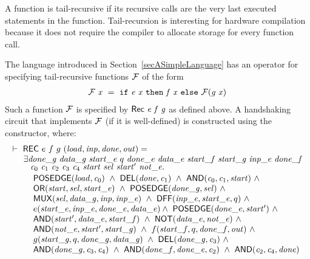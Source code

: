 \documentclass{llncs}
\begin{document}
A function is tail-recursive if its recursive
calls are the very last executed statements in the
function. Tail-recursion is interesting
for hardware compilation because it does not 
require the compiler to allocate storage for 
every function call.

The language introduced in Section~\ref{secASimpleLanguage} 
has an operator  for specifying tail-recursive functions ${\cal{F}}$
of the form
\[
\begin{array}{l}
\mathit{{\cal{F}}}\ \mathit{x} ~=~ \texttt{if}~\mathit{e}\ \mathit{x}~\texttt{then}~\mathit{f}\ \mathit{x}~\texttt{else}~\mathit{{\cal{F}}}(\mathit{g}\  \mathit{x})
\end{array}
\]
Such a function ${\cal{F}}$ is specified by $\mathsf{Rec}~\mathit{e}~\mathit{f}~\mathit{g}$ as defined
above. A handshaking circuit that implements ${\cal{F}}$ (if it is well-defined) is
constructed using the  constructor, where:
\[
\begin{array}{l}
\TURNST\ \DEF{REC}\ e\ f\ g\ (\VAR{load,inp,done,out}) = \\
\phantom{\TURNST\ ~}
     \exists \VAR{done\_g}~ \VAR{data\_g}~ \VAR{start\_e}~ q~ \VAR{done\_e}~ 
             \VAR{data\_e}~ \VAR{start\_f}~ \VAR{start\_g}~ \VAR{inp\_e}~ 
             \VAR{done\_f}\\[-1mm]
\phantom{\TURNST\ ~\exists }
             \sVAR{c}{0}~ \sVAR{c}{1}~ 
             \sVAR{c}{2}~ \sVAR{c}{3}~\sVAR{c}{4}~
             \VAR{start}~ \VAR{sel}~ \VAR{start'}~ \VAR{not\_e}. \\[0.5mm]
\phantom{\TURNST\ ~\exists~ }
        \DEF{POSEDGE}(\VAR{load},\sVAR{c}{0})\ \AND\
        \DEF{DEL}(\VAR{done},\sVAR{c}{1})\ \AND\
        \DEF{AND}(\sVAR{c}{0},\sVAR{c}{1},\VAR{start})\ \AND \\
\phantom{\TURNST\ ~\exists~ }
        \DEF{OR}(\VAR{start,sel,start\_e})\ \AND\
        \DEF{POSEDGE}(\VAR{done\_g,sel})\ \AND \\
\phantom{\TURNST\ ~\exists~ }
        \DEF{MUX}(\VAR{sel,data\_g,inp,inp\_e})\ \AND\
           \DEF{DFF}(\VAR{inp\_e},\VAR{start\_e},q)\ \AND \\
\phantom{\TURNST\ ~\exists~ }
           e (\VAR{start\_e},\VAR{inp\_e},\VAR{done\_e},\VAR{data\_e}) \AND\
        \DEF{POSEDGE}(\VAR{done\_e,start'})\ \AND \\
\phantom{\TURNST\ ~\exists~ }
        \DEF{AND}(\VAR{start',data\_e,start\_f})\ \AND\
        \DEF{NOT}(\VAR{data\_e,not\_e})\ \AND \\
\phantom{\TURNST\ ~\exists~ }
        \DEF{AND}(\VAR{not\_e,start',start\_g})\ \AND\
           f (\VAR{start\_f},q,\VAR{done\_f},\VAR{out})\ \AND\\
\phantom{\TURNST\ ~\exists~ }
           g (\VAR{start\_g},q,\VAR{done\_g},\VAR{data\_g})\ \AND\
        \DEF{DEL}(\VAR{done\_g},\sVAR{c}{3})\ \AND\\
\phantom{\TURNST\ ~\exists~ }
        \DEF{AND}(\VAR{done\_g},\sVAR{c}{3},\sVAR{c}{4})\ \AND\
        \DEF{AND}(\VAR{done\_f},\VAR{done\_e},\sVAR{c}{2})\ \AND\
        \DEF{AND}(\sVAR{c}{2},\sVAR{c}{4},\VAR{done})
\end{array}
\]
\end{document}
